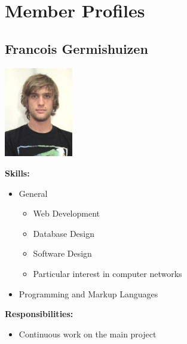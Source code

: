 \documentclass[a4paper,12pt,final]{article}
\begin{document}
\section{Member Profiles}
\subsection{Francois Germishuizen}
\begin{center}
\includegraphics[width=3cm]{Francois.jpg}
\end{center}
\textbf{Skills:}
\begin{itemize}
\item General
\begin{itemize}
\item Web Development
\item Database Design
\item Software Design
\item Particular interest in computer networks
\end{itemize}
\item Programming and Markup Languages
\begin{itemize}
\end{itemize}
\end{itemize}
\textbf{Responsibilities:}
\begin{itemize}
\item Continuous work on the main project
\end{itemize}
\end{document}

